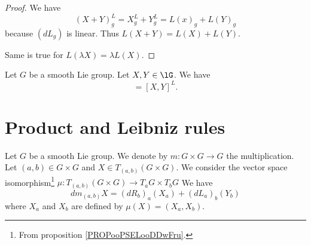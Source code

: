 \begin{proof}
	We have
	\begin{equation}
		(X+Y)^L_g=X^L_g+Y^L_g=L(x)_g+L(Y)_g
	\end{equation}
	because \( (dL_g)\) is linear. Thus \( L(X+Y)=L(X)+L(Y)\).

	Same is true for \( L(\lambda X)=\lambda L(X)\).
\end{proof}


\begin{proposition}	\label{PROPooPYVRooFtRGaj}
	Let \( G\) be a smooth Lie group. Let \( X,Y\in \lG\). We have
	\begin{equation}
		[X^L,Y^L]=[X,Y]^L.
	\end{equation}
\end{proposition}


\section{Product and Leibniz rules}


\begin{proposition}	\label{PROPooPPJJooBQgHMd}
	Let \( G\) be a smooth Lie group. We denote by \(m \colon G\times G\to G  \) the multiplication. Let \( (a,b)\in G\times G\) and \( X\in T_{(a,b)}(G\times G)\). We consider the vector space isomorphism\footnote{From proposition \ref{PROPooPSELooDDwFru}.} \(\mu \colon T_{(a,b)}(G\times G)\to T_aG\times T_bG  \)
	We have
	\begin{equation}
		dm_{(a,b)}X=(dR_b)_a(X_a)+(dL_a)_b(Y_b)
	\end{equation}
	where \( X_a\) and \( X_b\) are defined by \( \mu(X)=(X_a,X_b)\).
\end{proposition}


